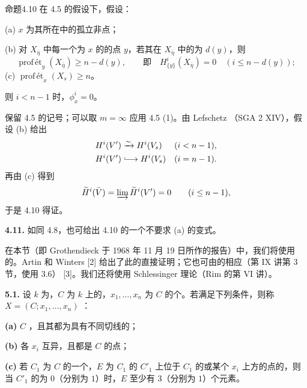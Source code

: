 \begin{SGAresult}{命题}{4.10}
在 4.5 的假设下，假设：

\textup{(a)} $x$ 为其所在中的孤立非点；

\textup{(b)} 对 $X_{\bar\eta}$ 中每一个为 $x$ 的的点 $y$，若其在 $X_{\bar\eta}$ 中的为 $d(y)$，则
\[
\operatorname{prof\,\text{ét}}_y(X_{\bar\eta})\ge n-d(y),
\qquad\text{即}\quad
H^i_{\{y\}}(X_{\bar\eta})=0\quad(i\le n-d(y));
\]
\textup{(c)} $\operatorname{prof\,\text{ét}}_x(X_s)\ge n$。

则 $i<n-1$ 时，$\phi_x^i=0$。
\end{SGAresult}
保留 4.5 的记号；可以取 $m=\infty$ 应用 4.5 (1)。由 Lefschetz （SGA 2 XIV），假设 (b) 给出
\[
\begin{aligned}
H^i(V')&\xrightarrow{\sim}H^i(V_s)&&(i<n-1),\\
H^i(V')&\lhook\joinrel\longrightarrow H^i(V_s)&&(i=n-1).
\end{aligned}
\]
再由 (c) 得到
\[
\widetilde H^i(\bar V)=\varinjlim\widetilde H^i(V')=0\qquad(i\le n-1),
\]
于是 4.10 得证。

\textbf{4.11.} 如同 4.8，也可给出 4.10 的一个不要求 (a) 的变式。

在本节（即 Grothendieck 于 1968 年 11 月 19 日所作的报告）中，我们将使用的。Artin 和 Winters [2] 给出了此的直接证明；它也可由的相应（第 IX 讲第 3 节，使用 3.6） [3]。我们还将使用 Schlessinger 理论（Rim 的第 VI 讲）。

\textbf{5.1.} 设 $k$ 为，$C$ 为 $k$ 上的，$x_1,\ldots,x_n$ 为 $C$ 的个。若满足下列条件，则称 $X=(C;x_1,\ldots,x_n)$ ：

\textbf{(a)} $C$ ，且其都为具有不同切线的；

\textbf{(b)} 各 $x_i$ 互异，且都是 $C$ 的点；

\textbf{(c)} 若 $C_1$ 为 $C$ 的一个，$E$ 为 $C_1$ 的 $C'_1$ 上位于 $C_1$ 的或某个 $x_i$ 上方的点的，则当 $C'_1$ 的为 $0$（分别为 $1$）时，$E$ 至少有 $3$（分别为 $1$）个元素。

